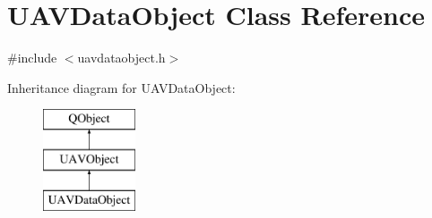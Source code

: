 \hypertarget{class_u_a_v_data_object}{\section{U\-A\-V\-Data\-Object Class Reference}
\label{class_u_a_v_data_object}
}


{\ttfamily \#include $<$uavdataobject.\-h$>$}

Inheritance diagram for U\-A\-V\-Data\-Object\-:\begin{figure}[H]
\begin{center}
\leavevmode
\includegraphics[height=3.000000cm]{class_u_a_v_data_object}
\end{center}
\end{figure}
